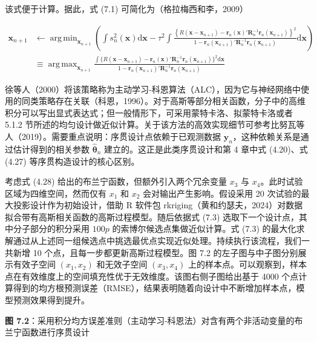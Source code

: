 \documentclass{ctexart}
\DeclareMathOperator*{\argmin}{arg\,min}
\DeclareMathOperator*{\argmax}{arg\,max}
\begin{document}
该式便于计算。据此，式 (7.1) 可简化为（格拉梅西和李，2009）

\begin{align*}
\boldsymbol{x}_{n+1}&\leftarrow\argmin_{\boldsymbol{x}_{n+1}}\left(\int s_n^2(\boldsymbol{x})\mathrm{d}\boldsymbol{x}-\tau^2\int\frac{\left\{R(\boldsymbol{x}-\boldsymbol{x}_{n+1})-\boldsymbol{r}_n(\boldsymbol{x})'\boldsymbol{R}_n^{-1}\boldsymbol{r}_n(\boldsymbol{x}_{n+1})\right\}^2}{1-\boldsymbol{r}_n(\boldsymbol{x}_{n+1})'\boldsymbol{R}_n^{-1}\boldsymbol{r}_n(\boldsymbol{x}_{n+1})}\mathrm{d}\boldsymbol{x}\right)\\
&\equiv\argmax_{\boldsymbol{x}_{n+1}}\frac{\int\{R(\boldsymbol{x}-\boldsymbol{x}_{n+1})-\boldsymbol{r}_n(\boldsymbol{x})'\boldsymbol{R}_n^{-1}\boldsymbol{r}_n(\boldsymbol{x}_{n+1})\}^2\mathrm{d}\boldsymbol{x}}{1-\boldsymbol{r}_n(\boldsymbol{x}_{n+1})'\boldsymbol{R}_n^{-1}\boldsymbol{r}_n(\boldsymbol{x}_{n+1})}
\tag{7.3}
\end{align*}

徐等人（2000）将该策略称为主动学习‑科恩算法（ALC），因为它与神经网络中使用的同类策略存在关联（科恩，1996）。对于高斯等部分相关函数，分子中的高维积分可以写出显式表达式；但一般情形下，可采用蒙特卡洛、拟蒙特卡洛或者 5.1.2 节所述的均匀设计做近似计算。关于该方法的高效实现细节可参考比努瓦等人（2019）。需要重点说明：序贯设计点依赖于已观测数据 $\boldsymbol{y}_n$，这种依赖关系是通过估计得到的相关参数 $\widehat{\boldsymbol{\theta}}_n$ 建立的。这正是此类序贯设计和第 4 章中式 (4.20)、式 (4.27) 等序贯构造设计的核心区别。

考虑式 (4.28) 给出的布兰宁函数，但额外引入两个冗余变量 $x_3$ 与 $x_4$。此时试验区域为四维空间，然而仅有 $x_1$ 和 $x_2$ 会对输出产生影响。假设采用 20 次试验的最大投影设计作为初始设计，借助 R 软件包 rkriging（黄和约瑟夫，2024）对数据拟合带有高斯相关函数的高斯过程模型。随后依据式 (7.3) 选取下一个设计点，其中分子部分的积分采用 $100p$ 的索博尔候选点集做近似计算。式 (7.3) 的最大化求解通过从上述同一组候选点中挑选最优点实现近似处理。持续执行该流程，我们一共新增 10 个点，且每一步都更新高斯过程模型。图 7.2 的左子图与中子图分别展示有效子空间 $(x_1,x_2)$ 和无效子空间 $(x_3,x_4)$ 上的样本点。可以观察到，样本点在有效维度上的空间填充性优于无效维度。该图右侧子图给出基于 4000 个点计算得到的均方根预测误差（RMSE），结果表明随着向设计中不断增加样本点，模型预测效果得到提升。

\begin{mdquote}
\textbf{图 7.2}：采用积分均方误差准则（主动学习‑科恩法）对含有两个非活动变量的布兰宁函数进行序贯设计
\end{mdquote}
\end{document}
